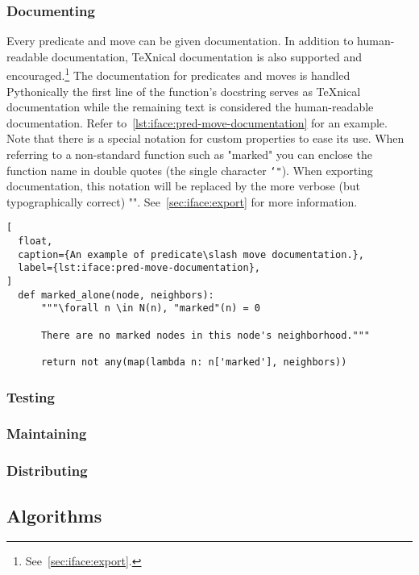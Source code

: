 \subsubsection{Documenting}
Every predicate and move can be given documentation.
In addition to human-readable documentation,
  \TeX nical documentation is also supported and encouraged.\footnote{%
    See~\autoref{sec:iface:export}.}
The documentation for predicates and moves is handled Pythonically \Dash
  the first line of the function's docstring serves as \TeX nical documentation
  while the remaining text is considered the human-readable documentation.
Refer to~\autoref{lst:iface:pred-move-documentation} for an example.
Note that there is a special notation for custom properties to ease its use.
When referring to a non-standard function
  \Dash such as "marked" \Dash
  you can enclose the function name in double quotes (the single character \texttt{\char`"}).
When exporting documentation,
  this notation will be replaced by the more verbose (but typographically correct) "\operatorname".
See~\autoref{sec:iface:export} for more information.
\begin{lstlisting}[
  float,
  caption={An example of predicate\slash move documentation.},
  label={lst:iface:pred-move-documentation},
]
  def marked_alone(node, neighbors):
      """\forall n \in N(n), "marked"(n) = 0
  
      There are no marked nodes in this node's neighborhood."""
  
      return not any(map(lambda n: n['marked'], neighbors))
\end{lstlisting}

\subsubsection{Testing}
\subsubsection{Maintaining}
\subsubsection{Distributing}

\subsection{Algorithms}

